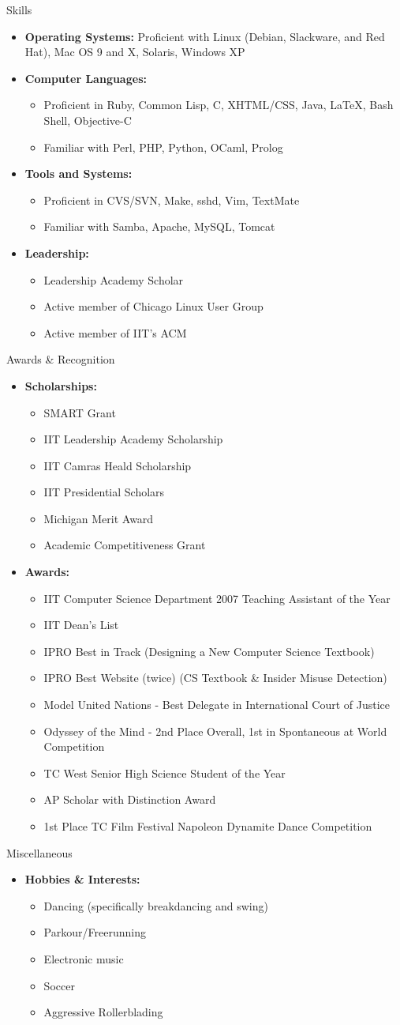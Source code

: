 \documentclass[11pt,oneside]{article}
\newenvironment{ressection}[1]{
	\vspace{4pt}
	{\fontfamily{phv}\selectfont\Large#1}
	\begin{itemize}
	\vspace{3pt}
}{
	\end{itemize}
}
\newcommand{\resitem}[1]{
	\vspace{-4pt}
	\item \begin{flushleft} #1 \end{flushleft}
}
\newcommand{\ressubitem}[1]{
	\vspace{-1pt}
	\item \begin{flushleft} #1 \end{flushleft}
}
\newenvironment{reslist}[1]{
	\resitem{\textbf{#1}}
	\vspace{-5pt}
	\begin{itemize}
}{
	\end{itemize}
}
\begin{document}
\begin{ressection}{Skills}

	\resitem{\textbf{Operating Systems:} Proficient with Linux (Debian, Slackware, and Red Hat), Mac OS 9 and X, Solaris, Windows XP}

	\begin{reslist}{Computer Languages:}

		\ressubitem{Proficient in Ruby, Common Lisp, C, XHTML/CSS, Java, \LaTeX, Bash Shell, Objective-C}

		\ressubitem{Familiar with Perl, PHP, Python, OCaml, Prolog}

	\end{reslist}

	\begin{reslist}{Tools and Systems:}

		\ressubitem{Proficient in CVS/SVN, Make, sshd, Vim, TextMate}

	\ressubitem{Familiar with Samba, Apache, MySQL, Tomcat}

	\end{reslist}
	
	\begin{reslist}{Leadership:}
		\ressubitem{Leadership Academy Scholar}
		\ressubitem{Active member of Chicago Linux User Group}
		\ressubitem{Active member of IIT's ACM}
	\end{reslist}

\end{ressection}

\begin{ressection}{Awards \& Recognition}
	\begin{reslist}{Scholarships:}
		\ressubitem{SMART Grant}
        \ressubitem{IIT Leadership Academy Scholarship}
        \ressubitem{IIT Camras Heald Scholarship}
        \ressubitem{IIT Presidential Scholars}
        \ressubitem{Michigan Merit Award}
        \ressubitem{Academic Competitiveness Grant}
	\end{reslist}
	
	\begin{reslist}{Awards:}
		\ressubitem{IIT Computer Science Department 2007 Teaching Assistant of the Year}
        \ressubitem{IIT Dean's List}
        \ressubitem{IPRO Best in Track (Designing a New Computer Science Textbook)}
        \ressubitem{IPRO Best Website (twice) (CS Textbook \& Insider Misuse Detection)}
        \ressubitem{Model United Nations - Best Delegate in International Court of Justice}
        \ressubitem{Odyssey of the Mind - 2nd Place Overall, 1st in Spontaneous at World Competition}
        \ressubitem{TC West Senior High Science Student of the Year}
		\ressubitem{AP Scholar with Distinction Award}
        \ressubitem{1st Place TC Film Festival Napoleon Dynamite Dance Competition}
	\end{reslist}
\end{ressection}

\begin{ressection}{Miscellaneous}
	\begin{reslist}{Hobbies \& Interests:}
		\ressubitem{Dancing (specifically breakdancing and swing)}
		\ressubitem{Parkour/Freerunning}
		\ressubitem{Electronic music}
		\ressubitem{Soccer}
		\ressubitem{Aggressive Rollerblading}
	\end{reslist}
\end{ressection}
\end{document}
